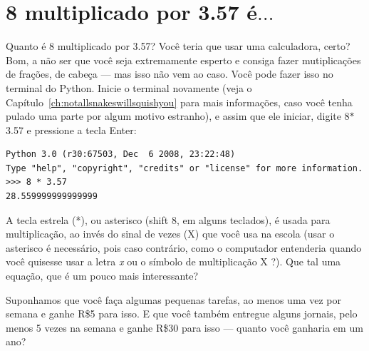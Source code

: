 

\chapter{8 multiplicado por 3.57 é$\ldots$}\label{ch:8multipliedby3.57}

Quanto é 8 multiplicado por 3.57? Você teria que usar uma calculadora, certo? Bom, a não ser que você seja extremamente esperto e consiga fazer mutiplicações de frações, de cabeça --- mas isso não vem ao caso. Você pode fazer isso no terminal do Python. Inicie o terminal novamente (veja o Capítulo~\ref{ch:notallsnakeswillsquishyou} para mais informações, caso você tenha pulado uma parte por algum motivo estranho), e assim que ele iniciar, digite 8$*$3.57 e pressione a tecla Enter:

\begin{listing}
\begin{verbatim}
Python 3.0 (r30:67503, Dec  6 2008, 23:22:48) 
Type "help", "copyright", "credits" or "license" for more information.
>>> 8 * 3.57
28.559999999999999
\end{verbatim}
\end{listing}

A tecla estrela (*), ou asterisco (shift 8, em alguns teclados), é usada para multiplicação, ao invés do sinal de vezes (\textsf{X}) que você usa na escola (usar o asterisco é necessário, pois caso contrário, como o computador entenderia quando você quisesse usar a letra \emph{x} ou o símbolo de multiplicação \textsf{X} ?). Que tal uma equação, que é um pouco mais interessante?

Suponhamos que você faça algumas pequenas tarefas, ao menos uma vez por semana e ganhe R\$5 para isso. E que você também entregue alguns jornais, pelo menos 5 vezes na semana e ganhe R\$30 para isso --- quanto você ganharia em um ano?

